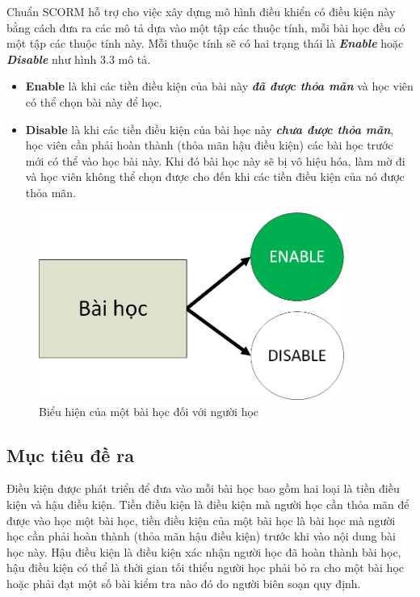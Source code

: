\newpage

	Chuẩn SCORM hỗ trợ cho việc xây dựng mô hình điều khiển có điều kiện này bằng cách đưa ra các mô tả dựa vào một tập các thuộc tính, mỗi bài học đều có một tập các thuộc tính này. Mỗi thuộc tính sẽ có hai trạng thái là \textbf{\textit{Enable}} hoặc \textbf{\textit{Disable}} như hình 3.3 mô tả.
	
	\begin{itemize}
		\item \textbf{Enable} là khi các tiền điều kiện của bài này \textbf{\textit{đã được thỏa mãn}} và học viên có thể chọn bài này để học. 
		
		\item \textbf{Disable} là khi các tiền điều kiện của bài học này \textbf{\textit{chưa được thỏa mãn}}, học viên cần phải hoàn thành (thỏa mãn hậu điều kiện) các bài học trước mới có thể vào học bài này. Khi đó bài học này sẽ bị vô hiệu hóa, làm mờ đi và học viên không thể chọn được cho đến khi các tiền điều kiện của nó được thỏa mãn.
	\end{itemize}
	
	

\begin{center}
	\begin{figure}[htp]
		\begin{center}
			\includegraphics[width=10cm]{Chapter3/Pictures/picture33.png}
		\end{center}
		\caption{Biểu hiện của một bài học đối với người học}
		\label{refpicture42}
	\end{figure}
\end{center}

	
	
\subsection{Mục tiêu đề ra}

	Điều kiện được phát triển để đưa vào mỗi bài học bao gồm hai loại là tiền điều kiện và hậu điều kiện.  Tiền điều kiện là điều kiện mà người học cần thỏa mãn để được vào học một bài học, tiền điều kiện của một bài học là bài học mà người học cần phải hoàn thành (thỏa mãn hậu điều kiện) trước khi vào nội dung bài học này. Hậu điều kiện là điều kiện xác nhận người học đã hoàn thành bài học, hậu điều kiện có thể là thời gian tối thiểu người học phải bỏ ra cho một bài học hoặc phải đạt một số bài kiểm tra nào đó do người biên soạn quy định.\\


